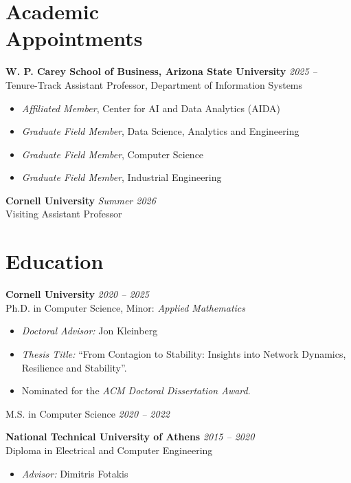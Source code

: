 \documentclass[margin]{res}
\newcommand{\field}[2]{\noindent \textbf{#1} \hfill #2 \\}
\begin{document}
\begin{resume}
\section{Academic \\ Appointments}

\field{W. P. Carey School of Business, Arizona State University}{\emph{2025 --}}{Tenure-Track Assistant Professor, Department of Information Systems} 

\begin{itemize}[nosep]
	\item \emph{Affiliated Member}, Center for AI and Data Analytics (AIDA)	
	\item \emph{Graduate Field Member}, Data Science, Analytics and Engineering
	\item \emph{Graduate Field Member}, Computer Science
	\item \emph{Graduate Field Member}, Industrial Engineering

\end{itemize}

\field{Cornell University}{\emph{Summer 2026}}{Visiting Assistant Professor} 

\section{Education}
\field {Cornell University} {\emph{2020 -- 2025}}
Ph.D. in Computer Science, Minor: \emph{Applied Mathematics}
\begin{itemize}[nosep]    
\item[--] \emph{Doctoral Advisor:} Jon Kleinberg
\item[--] \emph{Thesis Title:} ``From Contagion to Stability: Insights into Network Dynamics, Resilience and Stability''. 
\item[--] Nominated for the \emph{ACM Doctoral Dissertation Award}.

\end{itemize} 

M.S. in Computer Science \hfill \emph{2020 -- 2022}
 
\field{National Technical University of Athens}  {\emph{2015 -- 2020}} 
Diploma in Electrical and Computer Engineering 
\begin{itemize}[nosep]
\item[--] \emph{Advisor:} Dimitris Fotakis

\end{itemize} 



\end{resume}
\end{document}
